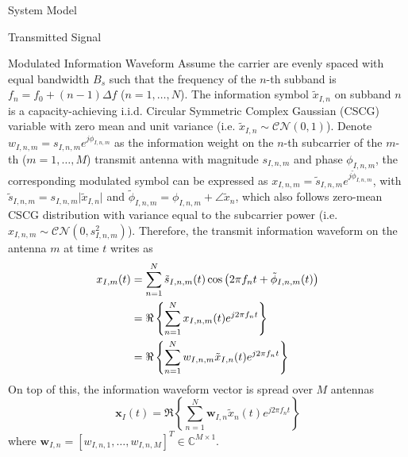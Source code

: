 \documentclass{IEEEtran}
\begin{document}
\begin{section} {System Model}
	\begin{subsection}	{Transmitted Signal}

		\begin{subsubsection} {Modulated Information Waveform}
			Assume the carrier are evenly spaced with equal bandwidth $B_s$ such that the frequency of the $n$-th subband is $f_n = f_0+(n-1) \Delta f$ ($n = 1,\dots,N$). The information symbol $\tilde{x}_{I,n}$ on subband $n$ is a capacity-achieving i.i.d. Circular Symmetric Complex Gaussian (CSCG) variable with zero mean and unit variance (i.e. $\tilde{x}_{I,n} \sim \mathcal{CN}(0,1)$). Denote $w_{I,n,m} = s_{I,n,m} e^{j\phi_{I,n,m}}$ as the information weight on the $n$-th subcarrier of the $m$-th ($m = 1,\dots,M$) transmit antenna with magnitude $s_{I,n,m}$ and phase $\phi_{I,n,m}$, the corresponding modulated symbol can be expressed as $x_{I,n,m} = \tilde{s}_{I,n,m} e^{j\tilde{\phi}_{I,n,m}}$, with $\tilde{s}_{I,n,m} = s_{I,n,m} \lvert\tilde{x}_{I,n}\rvert$ and $\tilde{\phi}_{I,n,m} = \phi_{I,n,m} + \angle{\tilde{x}_n}$, which also follows zero-mean CSCG distribution with variance equal to the subcarrier power (i.e. $x_{I,n,m} \sim \mathcal{CN}(0,s_{I,n,m}^2)$). Therefore, the transmit information waveform on the antenna $m$ at time $t$ writes as
			\begin{equation}	\label{eq:x_{I,m}(t)}
				\begin{split}
					x_{I,m}(t)
					&= \sum_{n=1}^{N} \tilde{s}_{I,n,m}(t) \cos \left( 2 \pi f_n t + \tilde{\phi}_{I,n,m}(t) \right)	\\
					&= \Re \left\{ \sum_{n=1}^{N} x_{I,n,m}(t) e^{j2 \pi f_n t} \right\}	\\
					&= \Re \left\{ \sum_{n=1}^{N} w_{I,n,m} \tilde{x}_{I,n}(t) e^{j2 \pi f_n t} \right\}
				\end{split}
			\end{equation}
			On top of this, the information waveform vector is spread over $M$ antennas
			\begin{equation}	\label{eq:x_I(t)}
				\boldsymbol{x}_I(t) = \Re \left\{ \sum_{n=1}^{N} \boldsymbol{w}_{I,n}\tilde{x}_n(t) e^{j2{\pi}{f_n}t} \right\}
			\end{equation}
			where $\boldsymbol{w}_{I,n}=[w_{I,n,1},\dots,w_{I,n,M}]^T \in \mathbb{C}^{M \times 1}$.
		\end{subsubsection}


\end{subsection}
\end{section}
\end{document}

